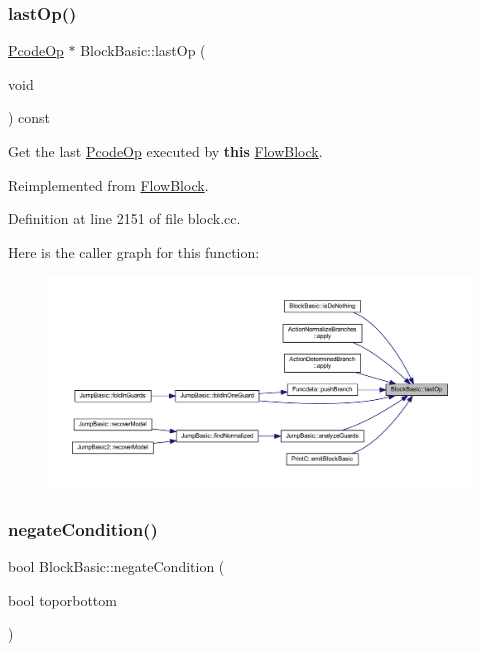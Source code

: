 \subsubsection{\texorpdfstring{lastOp()}{lastOp()}}
{\footnotesize\ttfamily \mbox{\hyperlink{class_pcode_op}{Pcode\+Op}} $\ast$ Block\+Basic\+::last\+Op (\begin{DoxyParamCaption}\item[{void}]{ }\end{DoxyParamCaption}) const\hspace{0.3cm}{\ttfamily [virtual]}}



Get the last \mbox{\hyperlink{class_pcode_op}{Pcode\+Op}} executed by {\bfseries{this}} \mbox{\hyperlink{class_flow_block}{Flow\+Block}}. 



Reimplemented from \mbox{\hyperlink{class_flow_block_a5db2a7d4baa2070ebf3151b13fd16d09}{Flow\+Block}}.



Definition at line 2151 of file block.\+cc.

Here is the caller graph for this function\+:
\nopagebreak
\begin{figure}[H]
\begin{center}
\leavevmode
\includegraphics[width=350pt]{class_block_basic_a42c5313d7980138d098e184b249b6415_icgraph}
\end{center}
\end{figure}
\mbox{\label{class_block_basic_aa15eaf687397a3b73da57abbb061a04c}} 
\subsubsection{\texorpdfstring{negateCondition()}{negateCondition()}}
{\footnotesize\ttfamily bool Block\+Basic\+::negate\+Condition (\begin{DoxyParamCaption}\item[{bool}]{toporbottom }\end{DoxyParamCaption})\hspace{0.3cm}{\ttfamily [virtual]}}




